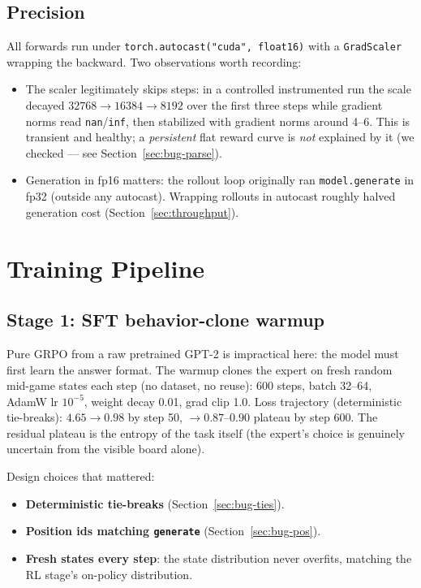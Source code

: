 \documentclass[11pt]{article}
\begin{document}
\subsection{Precision}
All forwards run under \texttt{torch.autocast("cuda", float16)} with a
\texttt{GradScaler} wrapping the backward. Two observations worth recording:
\begin{itemize}
\item The scaler legitimately skips steps: in a controlled instrumented run
the scale decayed $32768 \to 16384 \to 8192$ over the first three steps while
gradient norms read \texttt{nan}/\texttt{inf}, then stabilized with gradient
norms around 4--6. This is transient and healthy; a \emph{persistent} flat
reward curve is \emph{not} explained by it (we checked --- see
Section~\ref{sec:bug-parse}).
\item Generation in fp16 matters: the rollout loop originally ran
\texttt{model.generate} in fp32 (outside any autocast). Wrapping rollouts in
autocast roughly halved generation cost (Section~\ref{sec:throughput}).
\end{itemize}

\section{Training Pipeline}

\subsection{Stage 1: SFT behavior-clone warmup}
Pure GRPO from a raw pretrained GPT-2 is impractical here: the model must
first learn the answer format. The warmup clones the expert on fresh random
mid-game states each step (no dataset, no reuse): 600 steps, batch 32--64,
AdamW lr $10^{-5}$, weight decay 0.01, grad clip 1.0. Loss trajectory
(deterministic tie-breaks): $4.65 \to 0.98$ by step 50, $\to 0.87$--$0.90$
plateau by step 600. The residual plateau is the entropy of the task itself
(the expert's choice is genuinely uncertain from the visible board alone).

Design choices that mattered:
\begin{itemize}
\item \textbf{Deterministic tie-breaks} (Section~\ref{sec:bug-ties}).
\item \textbf{Position ids matching \texttt{generate}} (Section~\ref{sec:bug-pos}).
\item \textbf{Fresh states every step}: the state distribution never
overfits, matching the RL stage's on-policy distribution.
\end{itemize}
\end{document}
